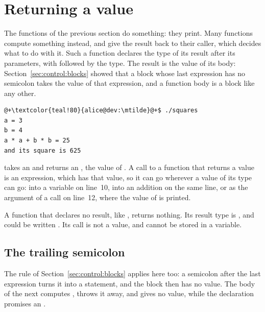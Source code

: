 \vfill\pagebreak
\section{Returning a value}
\label{sec:functions:return}

The functions of the previous section do something: they print. Many functions
compute something instead, and give the result back to their caller, which
decides what to do with it. Such a function declares the type of its result
after its parameters, with \token{->} followed by the type. The result is the
value of its body: Section~\ref{sec:control:blocks} showed that a block whose
last expression has no semicolon takes the value of that expression, and a
function body is a block like any other.


\vspace{-10pt}%
\begin{lstlisting}[style=bashVerb, escapechar=@+]
@+\textcolor{teal!80}{alice@dev:\mtilde}@+$ ./squares
a = 3
b = 4
a * a + b * b = 25
and its square is 625
\end{lstlisting}

 takes an  and returns an , the value of
. A call to a function that returns a value is an expression, which
has that value, so it can go wherever a value of its type can go: into a variable
on line~10, into an addition on the same line, or as the argument of a call on
line~12, where the value of  is printed.

A function that declares no result, like , returns nothing. Its
result type is , and  could be written
. Its call is not a value, and cannot be stored in a
variable.

\subsection{The trailing semicolon}

The rule of Section~\ref{sec:control:blocks} applies here too: a semicolon after
the last expression turns it into a statement, and the block then has no value.
The body of the next  computes , throws it away, and
gives no value, while the declaration promises an .

